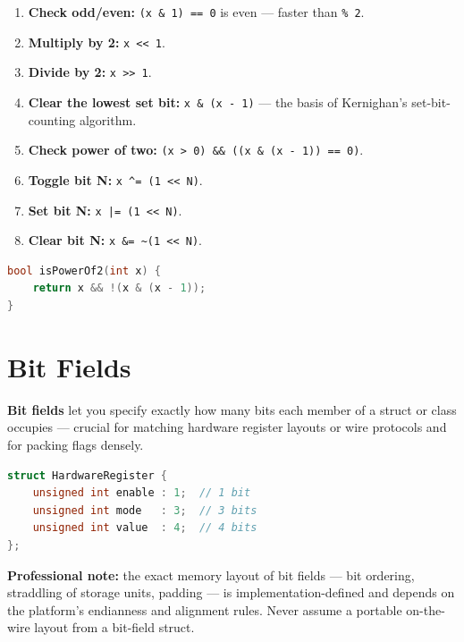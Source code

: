 \begin{enumerate}
    \item \textbf{Check odd/even:} \texttt{(x \& 1) == 0} is even --- faster than \texttt{\% 2}.
    \item \textbf{Multiply by 2:} \texttt{x << 1}.
    \item \textbf{Divide by 2:} \texttt{x >> 1}.
    \item \textbf{Clear the lowest set bit:} \texttt{x \& (x - 1)} --- the basis of Kernighan's set-bit-counting algorithm.
    \item \textbf{Check power of two:} \texttt{(x > 0) \&\& ((x \& (x - 1)) == 0)}.
    \item \textbf{Toggle bit N:} \texttt{x \^{}= (1 << N)}.
    \item \textbf{Set bit N:} \texttt{x |= (1 << N)}.
    \item \textbf{Clear bit N:} \texttt{x \&= \~{}(1 << N)}.
\end{enumerate}

\begin{lstlisting}[language=C++, caption={Branch-free power-of-two test}]
bool isPowerOf2(int x) {
    return x && !(x & (x - 1));
}
\end{lstlisting}

\section{Bit Fields}
\label{sec:bit-fields}

\textbf{Bit fields} let you specify exactly how many bits each member of a struct or class occupies --- crucial for matching hardware register layouts or wire protocols and for packing flags densely.

\begin{lstlisting}[language=C++, caption={A bit-field struct mirroring a hardware register}]
struct HardwareRegister {
    unsigned int enable : 1;  // 1 bit
    unsigned int mode   : 3;  // 3 bits
    unsigned int value  : 4;  // 4 bits
};
\end{lstlisting}

\textbf{Professional note:} the exact memory layout of bit fields --- bit ordering, straddling of storage units, padding --- is implementation-defined and depends on the platform's endianness and alignment rules. Never assume a portable on-the-wire layout from a bit-field struct.

